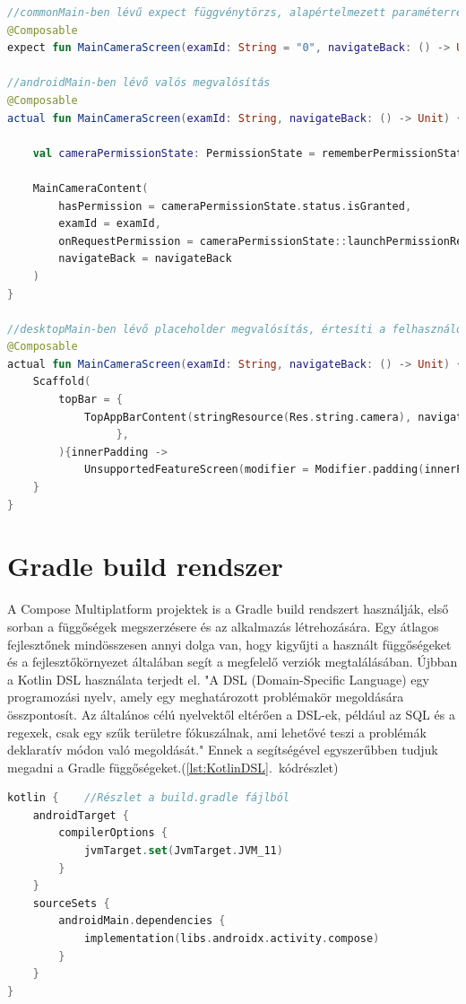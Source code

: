 \begin{lstlisting}[caption={Expect és actual használata}, label={lst:ExpectActual}, language=Kotlin]
//commonMain-ben lévű expect függvénytörzs, alapértelmezett paraméterrel.
@Composable
expect fun MainCameraScreen(examId: String = "0", navigateBack: () -> Unit)

//androidMain-ben lévő valós megvalósítás
@Composable
actual fun MainCameraScreen(examId: String, navigateBack: () -> Unit) {

    val cameraPermissionState: PermissionState = rememberPermissionState(android.Manifest.permission.CAMERA)

    MainCameraContent(
        hasPermission = cameraPermissionState.status.isGranted,
        examId = examId,
        onRequestPermission = cameraPermissionState::launchPermissionRequest,
        navigateBack = navigateBack
    )
}

//desktopMain-ben lévő placeholder megvalósítás, értesíti a felhasználót, hogy ez a funkció az eszközén nem támogatott
@Composable
actual fun MainCameraScreen(examId: String, navigateBack: () -> Unit) {
    Scaffold(
        topBar = {
            TopAppBarContent(stringResource(Res.string.camera), navigateBack)
                 },
        ){innerPadding ->
            UnsupportedFeatureScreen(modifier = Modifier.padding(innerPadding))
    }
}
\end{lstlisting}

\section{Gradle build rendszer}

A Compose Multiplatform projektek is a Gradle build rendszert használják, első sorban a függőségek megszerzésere és az alkalmazás létrehozására.
Egy átlagos fejlesztőnek mindösszesen annyi dolga van, hogy kigyűjti a használt függőségeket és a fejlesztőkörnyezet általában segít a megfelelő verziók megtalálásában.
Újbban a Kotlin DSL használata terjedt el.
"A DSL (Domain-Specific Language) egy programozási nyelv, amely egy meghatározott problémakör megoldására összpontosít. Az általános célú nyelvektől eltérően a DSL-ek, például az SQL és a regexek, csak egy szűk területre fókuszálnak, ami lehetővé teszi a problémák deklaratív módon való megoldását."\cite{KotlinDSL}
Ennek a segítségével egyszerűbben tudjuk megadni a Gradle függőségeket.(\ref{lst:KotlinDSL}.~kódrészlet)

\begin{lstlisting}[caption={Kotlin DSL}, label={lst:KotlinDSL}, language=Kotlin]
kotlin {    //Részlet a build.gradle fájlból
    androidTarget {
        compilerOptions {
            jvmTarget.set(JvmTarget.JVM_11)
        }
    }
    sourceSets {
        androidMain.dependencies {
            implementation(libs.androidx.activity.compose)
        }
    }
}
\end{lstlisting}

